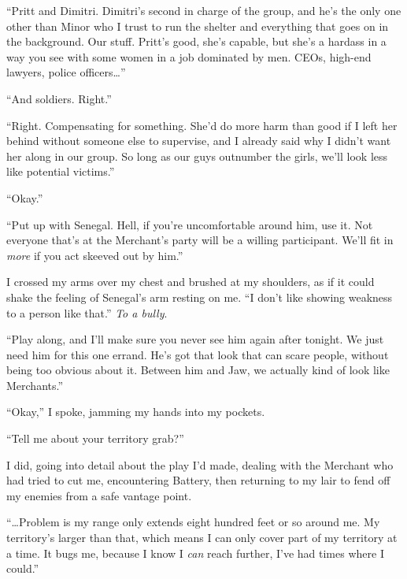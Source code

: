 ``Pritt and Dimitri.  Dimitri's second in charge of the group, and he's the only one other than Minor who I trust to run the shelter and everything that goes on in the background.  Our stuff.  Pritt's good, she's capable, but she's a hardass in a way you see with some women in a job dominated by men.  CEOs, high-end lawyers, police officers\ldots''



``And soldiers.  Right.''



``Right.  Compensating for something.  She'd do more harm than good if I left her behind without someone else to supervise, and I already said why I didn't want her along in our group.  So long as our guys outnumber the girls, we'll look less like potential victims.''



``Okay.''



``Put up with Senegal.  Hell, if you're uncomfortable around him, use it.  Not everyone that's at the Merchant's party will be a willing participant.  We'll fit in \emph{more} if you act skeeved out by him.''



I crossed my arms over my chest and brushed at my shoulders, as if it could shake the feeling of Senegal's arm resting on me.  ``I don't like showing weakness to a person like that.''  \emph{To a bully}.



``Play along, and I'll make sure you never see him again after tonight.  We just need him for this one errand.  He's got that look that can scare people, without being too obvious about it.  Between him and Jaw, we actually kind of look like Merchants.''



``Okay,'' I spoke, jamming my hands into my pockets.



``Tell me about your territory grab?''



I did, going into detail about the play I'd made, dealing with the Merchant who had tried to cut me, encountering Battery, then returning to my lair to fend off my enemies from a safe vantage point.



``\ldots{}Problem is my range only extends eight hundred feet or so around me.  My territory's larger than that, which means I can only cover part of my territory at a time.  It bugs me, because I know I \emph{can} reach further, I've had times where I could.''




